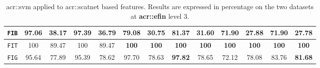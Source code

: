 \begin{sidewaystable}[htpb]
\begin{tabular}{| c | c c | c c | c c | c c | c c | c c |}
                    \hline
                    \texttt{FIB} & 97.06 & \textbf{38.17} & \textbf{97.39} & 36.79 & 79.08 & 30.75 & 81.37 & 31.60 & 71.90 & 27.88 & 71.90 & 27.78 \\
                    \hline
                    \texttt{FIT} & 100 & 89.47 & 100 & 89.47 & \textbf{100} & \textbf{100} & \textbf{100} & \textbf{100} & \textbf{100} & \textbf{100} & \textbf{100} & \textbf{100} \\
                    \hline
                    \texttt{FIG} & 95.64 & 77.89 & 95.39 & 78.62 & 97.70 & 78.63 & \textbf{97.82} & 78.65 & 72.12 & 78.08 & 83.76 & \textbf{81.68} \\
                    \hline
                \end{tabular}
                \caption{
                    \label{tab::stats_scat_svm_f3}
                    \gls{acr::svm} applied to \gls{acr::scatnet} based features.
                    Results are expressed in percentage on the two datasets at \textbf{\gls{acr::efin}} level 3.
                }
            \end{sidewaystable}

